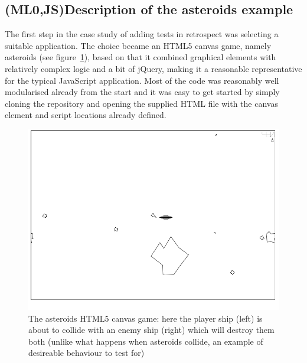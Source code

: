 \documentclass[11pt]{article}
\begin{document}
\subsection{(ML0,JS)Description of the asteroids example}
\label{subsec:asteriods}

The first step in the case study of adding tests in retrospect was selecting a suitable application. The choice became an HTML5 canvas game, namely asteroids (see figure~\ref{fig:game3}), based on that it combined graphical elements with relatively complex logic and a bit of jQuery, making it a reasonable representative for the typical JavaScript application. Most of the code was reasonably well modularised already from the start and it was easy to get started by simply cloning the repository and opening the supplied HTML file with the canvas element and script locations already defined.

\begin{figure}[ht!]
\centering
\includegraphics[width=1.0\textwidth]{pics/game3.png}
\caption{The asteroids HTML5 canvas game: here the player ship (left) is about to collide with an enemy ship (right) which will destroy them both (unlike what happens when asteroids collide, an example of desireable behaviour to test for)}
\label{fig:game3}
\end{figure}
\end{document}
